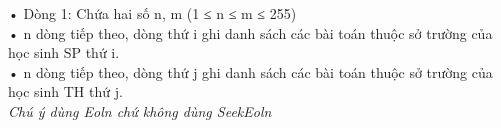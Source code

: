 • Dòng 1: Chứa hai số n, m (1 ≤ n ≤ m ≤ 255)   
\\   • n dòng tiếp theo, dòng thứ i ghi danh sách các bài toán thuộc sở trường của học sinh SP thứ i.   
\\   • n dòng tiếp theo, dòng thứ j ghi danh sách các bài toán thuộc sở trường của học sinh TH thứ j.   
\\\textit{    Chú ý dùng         Eoln        chứ không dùng         SeekEoln       }
\\

\